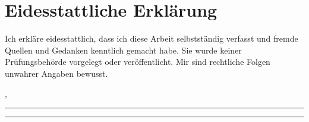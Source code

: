 \chapter*{Eidesstattliche Erklärung}

\pagestyle{plain}

Ich erkläre eidesstattlich, dass ich diese Arbeit selbstständig verfasst und fremde Quellen und Gedanken kenntlich gemacht habe. Sie wurde keiner Prüfungsbehörde vorgelegt oder veröffentlicht. Mir sind rechtliche Folgen unwahrer Angaben bewusst.

\vfill

\vspace*{\baselineskip}
\noindent \begin{minipage}{\textwidth}
	\noindent \begin{minipage}{0.49\textwidth}
		\begin{flushleft}
			, \rule{3cm}{0.5pt}
		\end{flushleft}
	\end{minipage} \hfill
	\begin{minipage}{0.49\textwidth}
		\begin{flushright}
			\rule{4cm}{0.5pt}
		\end{flushright}
	\end{minipage}
\end{minipage}

\newpage
